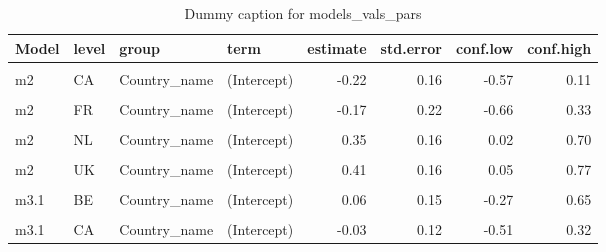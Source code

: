 \begin{table}
\centering
\caption{Dummy caption for models_vals_pars}
\centering
\fontsize{10}{12}\selectfont
\begin{tabular}[t]{llllrrrr}
\toprule
Model & level & group & term & estimate & std.error & conf.low & conf.high\\
\midrule
\cellcolor{gray!10}{m2} & \cellcolor{gray!10}{BE} & \cellcolor{gray!10}{Country\_name} & \cellcolor{gray!10}{(Intercept)} & \cellcolor{gray!10}{0.52} & \cellcolor{gray!10}{0.16} & \cellcolor{gray!10}{0.19} & \cellcolor{gray!10}{0.87}\\
m2 & CA & Country\_name & (Intercept) & -0.22 & 0.16 & -0.57 & 0.11\\
\cellcolor{gray!10}{m2} & \cellcolor{gray!10}{CH} & \cellcolor{gray!10}{Country\_name} & \cellcolor{gray!10}{(Intercept)} & \cellcolor{gray!10}{-0.14} & \cellcolor{gray!10}{0.20} & \cellcolor{gray!10}{-0.59} & \cellcolor{gray!10}{0.31}\\
m2 & FR & Country\_name & (Intercept) & -0.17 & 0.22 & -0.66 & 0.33\\
\cellcolor{gray!10}{m2} & \cellcolor{gray!10}{IL} & \cellcolor{gray!10}{Country\_name} & \cellcolor{gray!10}{(Intercept)} & \cellcolor{gray!10}{-0.09} & \cellcolor{gray!10}{0.35} & \cellcolor{gray!10}{-0.88} & \cellcolor{gray!10}{0.77}\\
m2 & NL & Country\_name & (Intercept) & 0.35 & 0.16 & 0.02 & 0.70\\
\cellcolor{gray!10}{m2} & \cellcolor{gray!10}{SE} & \cellcolor{gray!10}{Country\_name} & \cellcolor{gray!10}{(Intercept)} & \cellcolor{gray!10}{-0.38} & \cellcolor{gray!10}{0.17} & \cellcolor{gray!10}{-0.76} & \cellcolor{gray!10}{-0.01}\\
m2 & UK & Country\_name & (Intercept) & 0.41 & 0.16 & 0.05 & 0.77\\
\cellcolor{gray!10}{m2} & \cellcolor{gray!10}{US} & \cellcolor{gray!10}{Country\_name} & \cellcolor{gray!10}{(Intercept)} & \cellcolor{gray!10}{-0.23} & \cellcolor{gray!10}{0.17} & \cellcolor{gray!10}{-0.60} & \cellcolor{gray!10}{0.16}\\
m3.1 & BE & Country\_name & (Intercept) & 0.06 & 0.15 & -0.27 & 0.65\\
\cellcolor{gray!10}{m3.1} & \cellcolor{gray!10}{BE} & \cellcolor{gray!10}{Country\_name} & \cellcolor{gray!10}{EPS} & \cellcolor{gray!10}{0.14} & \cellcolor{gray!10}{0.08} & \cellcolor{gray!10}{-0.04} & \cellcolor{gray!10}{0.30}\\
m3.1 & CA & Country\_name & (Intercept) & -0.03 & 0.12 & -0.51 & 0.32\\

\end{tabular}
\end{table}
